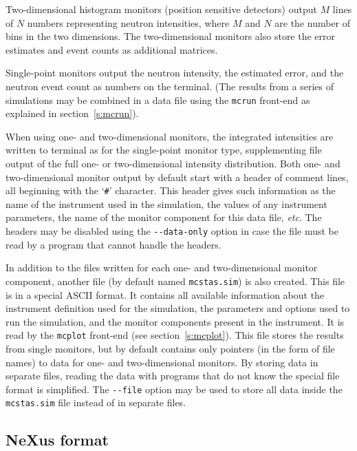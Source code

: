 Two-dimensional histogram monitors (position sensitive detectors) output $M$
lines of $N$ numbers representing neutron intensities, where $M$ and $N$ are the
number of bins in the two dimensions. The two-dimensional monitors also store
the error estimates and event counts as additional matrices.

Single-point monitors output the neutron intensity, the estimated
error, and the neutron event count as numbers on the
terminal. (The results from a series of simulations may be combined in a
data file using the \verb+mcrun+ front-end as explained in
section~\ref{s:mcrun}).

When using one- and two-dimensional monitors, the integrated intensities are
written to terminal as for the single-point monitor type, supplementing file
output of the full one- or two-dimensional intensity distribution. Both one- and
two-dimensional monitor output by default start with a header of comment lines,
all beginning with the `\verb+#+' character.  This header gives such information
as the name of the instrument used in the simulation, the values of any
instrument parameters, the name of the monitor component for this data file,
\textit{etc}. The headers may be disabled using the \verb+--data-only+ option in
case the file must be read by a program that cannot handle the headers.

In addition to the files written for each one- and two-dimensional monitor
component, another file (by default named \verb+mcstas.sim+) is also
created. This file is in a special \MCS ASCII format. It contains all available
information about the instrument definition used for the simulation, the
parameters and options used to run the simulation, and the monitor components
present in the instrument. It is read by the \verb+mcplot+ front-end (see
section~\ref{s:mcplot}). This file stores the results from single monitors, but
by default contains only pointers (in the form of file names) to data for one-
and two-dimensional monitors. By storing data in separate files, reading the
data with programs that do not know the special \MCS file format is
simplified. The \verb+--file+ option may be used to store all data inside the
\verb+mcstas.sim+ file instead of in separate files.

\subsection{NeXus format}
  
\label{r:nexus}


